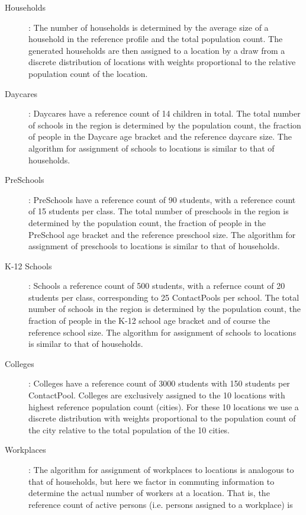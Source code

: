 \begin{description}
    \item[Households]:
        The number of households is determined by the average size of a household in the reference 
        profile and the total population count.
        The generated households are then assigned to a location by a draw from a discrete distribution of 
        locations with weights proportional to the  relative population count of the location.
    \item[Daycares]:
    	Daycares have a reference count of 14 children in total.
    	The total number of schools in the region is determined by the population count, the fraction 
        of people in the Daycare age bracket and the reference daycare size.
        The algorithm for assignment of schools to locations is similar to that of households.
    \item[PreSchools]:
    	PreSchools have a reference count of 90 students, with a reference count of 15 students per class.
    	The total number of preschools in the region is determined by the population count, the fraction 
        of people in the PreSchool age bracket and the reference preschool size.
        The algorithm for assignment of preschools to locations is similar to that of households.
    \item[K-12 Schools]:
        Schools a reference count of 500 students, with a refernce count of 20 students per class,
        corresponding to 25 ContactPools per school. 
        The total number of schools in the region is determined by the population count, the fraction 
        of people in the K-12 school age bracket and of course the reference school size.
        The algorithm for assignment of schools to locations is similar to that of households.
    \item[Colleges]:
        Colleges have a reference count of 3000 students with 150 students per ContactPool.
        Colleges are exclusively assigned to the 10 locations with highest reference population count (cities).
        For these 10 locations we use a discrete distribution with weights proportional to the population count 
        of the city relative to the total population of the 10 cities.
    \item[Workplaces]:
        The algorithm for assignment of workplaces to locations is analogous to that of households, 
        but here we factor in commuting information to determine the actual number of workers at a location.
        That is, the reference count of active persons (i.e. persons assigned to a workplace) is 

\end{description}
